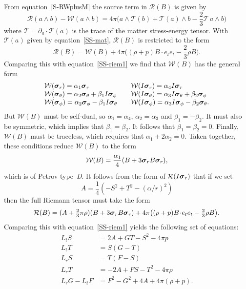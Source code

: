 \documentclass[a4paper]{article}
\numberwithin{equation}{section}
\newcommand{\barr}{\begin{array}}
\newcommand{\earr}{\end{array}}
\newcommand{\dt}{\! \cdot \!}
\newcommand{\wdg}{\! \wedge \!}
\newcommand{\tthird}{{\textstyle \frac{2}{3}}}
\newcommand{\qrt}{{\textstyle \frac{1}{4}}}
\newcommand{\eqv}{=}
\newcommand{\alp}{\alpha}
\newcommand{\bet}{\beta}
\newcommand{\sig}{\mbox{\boldmath $\sigma$}}
\newcommand{\bsig}{\mbox{\boldmath $\sig$}}
\newcommand{\clr}{{\mathcal{R}}}
\newcommand{\clt}{{\mathcal{T}}}
\newcommand{\clw}{{\mathcal{W}}}
\newcommand{\da}{\partial_a}
\newcommand{\sr}{\bsig_r}
\newcommand{\sigr}{\bsig_r}
\newcommand{\sigth}{\bsig_\theta}
\newcommand{\sigph}{\bsig_\phi}
\newcommand{\slD}{\textsl{D}}
\begin{document}
From equation~\eqref{S-RWplusM} the source term in $\clr(B)$ is given by
%
\begin{equation}
\clr(a \wdg b) - \clw(a \wdg b) = 4 \pi \bigl(a \wdg \clt(b) + \clt(a)
\wdg b - \tthird \clt \,  a \wdg b \bigr)
\end{equation}
%
where $\clt=\da\dt\clt(a)$ is the trace of the matter stress-energy
tensor.  With $\clt(a)$ given by equation~\eqref{SS-mat}, $\clr(B)$ is
restricted to the form
%
\begin{equation}
\clr(B) = \clw(B) + 4\pi \bigl( (\rho+p) B\dt e_t e_t -\tthird \rho B\bigr) .
\end{equation}
%
Comparing this with equation~\eqref{SS-riem1} we find that $\clw(B)$
has the general form
%
\begin{equation}
\barr{lcl}
\clw (\sigr) = \alp_1 \sr & & \clw(I\sigr) = \alp_4 I \sigr \\
\clw(\sigth) = \alp_2 \sigth + \beta_1 I\sigph & & 
\clw(I\sigth) = \alp_3 I\sigth + \beta_2 \sigph \\
\clw(\sigph) = \alp_2 \sigph - \beta_1 I\sigth & & 
\clw(I\sigph) = \alp_3 I\sigph - \beta_2 \sigth. \\
\earr
\end{equation}
%
But $\clw(B)$ must be self-dual, so $\alp_1=\alp_4$, $\alp_2 = \alp_3$
and $\bet_1=-\bet_2$.  It must also be symmetric, which implies that
$\bet_1=\bet_2$.  It follows that $\bet_1=\bet_2=0$.  Finally,
$\clw(B)$ must be traceless, which requires that $\alp_1 + 2\alp_2 =
0$.  Taken together, these conditions reduce $\clw(B)$ to the form
%
\begin{equation}
\clw(B) = \frac{\alp_1}{4} (B + 3 \sigr B \sigr),
\end{equation}
%
which is of Petrov type~\slD.  It follows from the form of
$\clr(I\sigr)$ that if we set 
%
\begin{equation}
A \eqv \qrt (-S^2 + T^2 -(\alp/r)^2)
\end{equation}
%
then the full Riemann tensor must take the form
%
\begin{equation}
\clr(B) = (A+ \tthird \pi \rho) (B + 3\sig_r B \sig_r) + 
4\pi \bigl((\rho+p) B\dt e_t e_t -\tthird \rho B \bigr) .
\end{equation}
%
Comparing this with equation~\eqref{SS-riem1} yields the following set of
equations:
%
\begin{align}
L_t S &= 2A +GT -S^2 -4\pi p \label{SS-eq3} \\
L_t T &= S(G-T) \label{SS-eq3a} \\
L_r S &= T(F-S) \label{SS-eq3b} \\
L_r T &= -2A + FS -T^2 -4\pi \rho \label{SS-eq3c} \\
L_r G - L_t F &= F^2 - G^2 +4A +4 \pi(\rho + p) . 
\label{SS-eq4}
\end{align}
%
\end{document}
